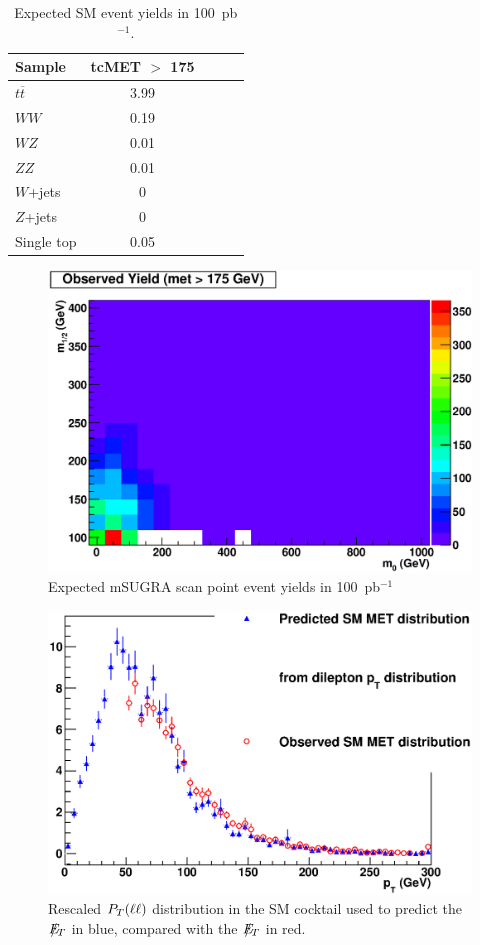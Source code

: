 \begin{table}[hbt]
\begin{center}
\begin{tabular}{|l|c|c|c|c|}\hline
Sample           & tcMET $>$ 175   \\ \hline
$t\overline{t}$  &   3.99          \\ 
$WW$             &   0.19          \\ 
$WZ$             &   0.01          \\ 
$ZZ$             &   0.01          \\ 
$W$+jets         &   0             \\
$Z$+jets         &   0             \\ 
Single top       &   0.05          \\ \hline
\end{tabular}
\caption{Expected SM event yields in 100~pb$^{-1}$.\label{tab:osyields}}
\end{center}
\end{table}

\begin{figure}[htb]
\begin{center}
\includegraphics[width=0.7\linewidth]{figs/hobs175_100pb.eps}
\caption{Expected mSUGRA scan point event yields in 100~pb$^{-1}$\label{fig:hobs175_100pb}}
\end{center}
\end{figure}

\begin{figure}[htb]
\begin{center}
\includegraphics[width=0.7\linewidth]{figs/smvictory.eps}
\caption{Rescaled $P_T(\ell\ell)$ distribution in the SM cocktail used to predict the $E\!\!\!\!/_T$ in blue, compared with the $E\!\!\!\!/_T$ in red.\label{fig:smvictory}}
\end{center}
\end{figure}


